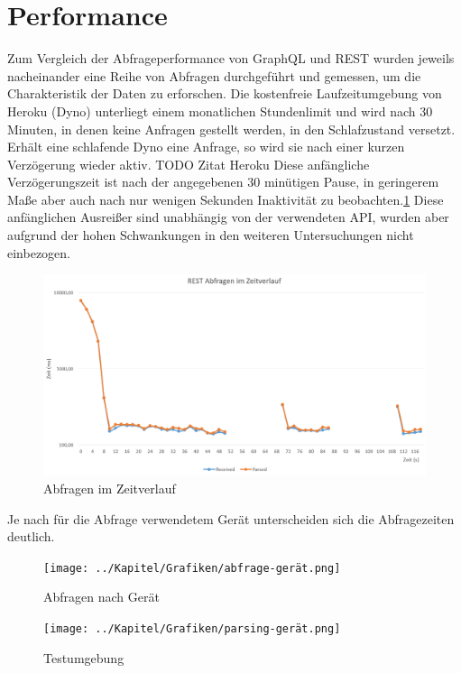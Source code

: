 \section{Performance}
Zum Vergleich der Abfrageperformance von GraphQL und REST wurden jeweils nacheinander eine Reihe von Abfragen durchgeführt und gemessen, um die Charakteristik der Daten zu erforschen.
Die kostenfreie Laufzeitumgebung von Heroku (Dyno) unterliegt einem monatlichen Stundenlimit und wird nach 30 Minuten, in denen keine Anfragen gestellt werden, in den Schlafzustand versetzt.
Erhält eine schlafende Dyno eine Anfrage, so wird sie nach einer kurzen Verzögerung wieder aktiv. TODO Zitat Heroku
Diese anfängliche Verzögerungszeit ist nach der angegebenen 30 minütigen Pause, in geringerem Maße aber auch nach nur wenigen Sekunden Inaktivität zu beobachten.\ref{img:abfrage-zeitverlauf}
Diese anfänglichen Ausreißer sind unabhängig von der verwendeten API, wurden aber aufgrund der hohen Schwankungen in den weiteren Untersuchungen nicht einbezogen. 
\begin{figure}[h!]
  \centering
  \includegraphics[width=\linewidth]{../Kapitel/Grafiken/abfragen-zeitverlauf.png}
  \caption{Abfragen im Zeitverlauf}
  \label{img:abfrage-zeitverlauf}
\end{figure}
Je nach für die Abfrage verwendetem Gerät unterscheiden sich die Abfragezeiten deutlich.
\begin{figure}[h!]
  \centering
  \texttt{[image: ../Kapitel/Grafiken/abfrage-gerät.png]}
  \caption{Abfragen nach Gerät}
  \label{img:abfrage-gerät}
\end{figure}
\begin{figure}[h!]
  \centering
  \texttt{[image: ../Kapitel/Grafiken/parsing-gerät.png]}
  \caption{Testumgebung}
  \label{img:REST-diss}
\end{figure}
